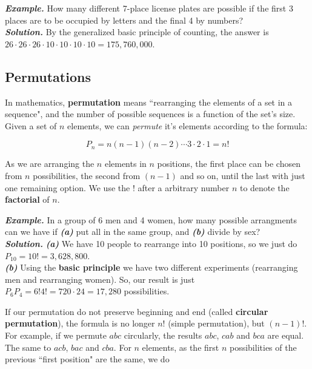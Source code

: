 \documentclass[a4paper,twocolumn]{article}
\begin{document}
\bigskip

\noindent\textbf{\textit{Example.}} How many different 7-place license plates are possible if the first 3 places are to be occupied by letters and the final 4 by numbers?\\
\noindent\textbf{\textit{Solution.}} By the generalized basic principle of counting, the answer is $26 \cdot 26 \cdot 26 \cdot 10 \cdot 10 \cdot 10 \cdot 10 = 175,760,000$.


\subsection{Permutations}
\label{subsec:permutations}

In mathematics, \textbf{permutation} means ``rearranging the elements of a set in a sequence", and the number of possible sequences is a function of the set's size. Given a set of $n$ elements, we can \textit{permute} it's elements according to the formula:

\begin{equation}
\label{eq:permutation}
P_n = n(n - 1)(n - 2) \dotsm 3 \cdot 2 \cdot 1 = n!
\end{equation}

\noindent As we are arranging the $n$ elements in $n$ positions, the first place can be chosen from $n$ possibilities, the second from $(n - 1)$ and so on, until the last with just one remaining option. We use the $!$ after a arbitrary number $n$ to denote the \textbf{factorial} of $n$.

\bigskip

\noindent\textbf{\textit{Example.}} In a group of 6 men and 4 women, how many possible arrangments can we have if \textbf{\textit{(a)}} put all in the same group, and \textbf{\textit{(b)}} divide by sex?\\
\noindent\textbf{\textit{Solution.}} \textbf{\textit{(a)}} We have 10 people to rearrange into 10 positions, so we just do $P_{10} = 10! = 3,628,800$.\\
\textbf{\textit{(b)}} Using the \textbf{basic principle} we have two different experiments (rearranging men and rearranging women). So, our result is just $P_6 P_4 = 6!4! = 720 \cdot 24 = 17,280$ possibilities.

\bigskip

If our permutation do not preserve beginning and end (called \textbf{circular permutation}), the formula is no longer $n!$ (simple permutation), but $(n - 1)!$. For example, if we permute $abc$ circularly, the results $abc$, $cab$ and $bca$ are equal. The same to $acb$, $bac$ and $cba$. For $n$ elements, as the first $n$ possibilities of the previous ``first position" are the same, we do
\end{document}
